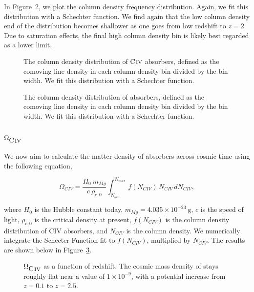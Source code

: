\documentclass[linenumbers,twocolumn]{aastex61}
\begin{document}
In Figure~\ref{fig:logndistro}, we plot the column density frequency distribution. Again, we fit this distribution with a Schechter function. We find again that the low column density end of the distribution becomes shallower as one goes from low redshift to $z = 2$. Due to saturation effects, the final high column density bin is likely best regarded as a lower limit.

\begin{figure*}[bth]
\caption{The column density distribution of ${\hbox{{\rm C}\kern 0.1em{\sc iv}}}$ absorbers, defined as the comoving line density in each column density bin divided by the bin width. We fit this distribution with a Schechter function.}
\label{fig:logndistrodndz}
\end{figure*}

\begin{figure*}[bth]
\caption{The column density distribution of {\CIV} absorbers, defined as the comoving line density in each column density bin divided by the bin width. We fit this distribution with a Schechter function.}
\label{fig:logndistro}
\end{figure*}

\subsection{$\Omega_{\hbox{{\rm C}\kern 0.1em{\sc iv}}}$}
\label{omegaciv}

We now aim to calculate the matter density of {\CIV} absorbers across cosmic time using the following equation,

\begin{equation}
\Omega_{CIV} = \frac{H_0\  m_{Mg}}{c\ \rho_{c,0}} \int_{N_{min}}^{N_{max}}\, f (N_{CIV})\, N_{CIV}\, dN_{CIV} ,
\label{eqn:omega}
\end{equation}

where $H_0$ is the Hubble constant today, $m_{Mg} = 4.035 \times 10^{-23}~\mathrm{g}$, $c$ is the speed of light, $\rho_{c,0}$ is the critical density at present, $f(N_{CIV})$ is the column density distribution of {CIV} absorbers, and $N_{CIV}$ is the column density. We numerically integrate the Schecter Function fit to $f(N_{CIV})$, multiplied by $N_{CIV}$. The results are shown below in Figure~\ref{fig:omegamgii}.

\begin{figure*}[bth]
\caption{$\Omega_{\hbox{{\rm C}\kern 0.1em{\sc iv}}}$ as a function of redshift. The cosmic mass density of {\CIV} stays roughly flat near a value of $1 \times 10^{-9}$, with a potential increase from $z = 0.1$ to $z = 2.5$.}
\label{fig:omegamgii}
\end{figure*}
\end{document}
